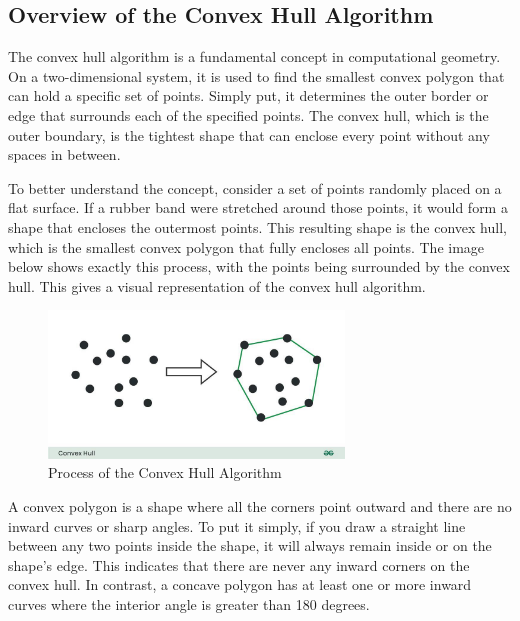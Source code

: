     \newpage

    \subsection{Overview of the Convex Hull Algorithm}
    The convex hull algorithm is a fundamental concept in computational geometry. On a two-dimensional system, it is used to find the smallest convex polygon that can hold a specific set of points. Simply put, it determines the outer border or edge that surrounds each of the specified points. The convex hull, which is the outer boundary, is the tightest shape that can enclose every point without any spaces in between. \newline
    
    To better understand the concept, consider a set of points randomly placed on a flat surface. If a rubber band were stretched around those points, it would form a shape that encloses the outermost points. This resulting shape is the convex hull, which is the smallest convex polygon that fully encloses all points. The image below shows exactly this process, with the points being surrounded by the convex hull. This gives a visual representation of the convex hull algorithm.
    \begin{figure} [H]
        \centering
        \includegraphics [width=0.7\textwidth] {images/andreas/areaBorders/convexHull.jpg}
        \caption{Process of the Convex Hull Algorithm \autocite{ProcessOfHull:Img}}
    \end{figure} 
    \blankLine 
    A convex polygon is a shape where all the corners point outward and there are no inward curves or sharp angles. To put it simply, if you draw a straight line between any two points inside the shape, it will always remain inside or on the shape's edge. This indicates that there are never any inward corners on the convex hull. In contrast, a concave polygon has at least one or more inward curves where the interior angle is greater than 180 degrees.

    \pagebreak

